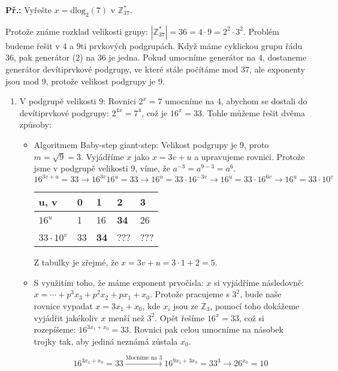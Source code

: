\documentclass[10pt,a4paper]{article}
\begin{document}
\begin{exercise}
\textbf{Př.:} Vyřešte $x = \text{dlog}_2 (7)$ v $\mathbb{Z}_{37}^*$.

Protože známe rozklad velikosti grupy: $|\mathbb{Z}_{37}^*| = 36 = 4 \cdot 9 =
2^2 \cdot 3^2$. Problém budeme řešit v 4 a 9ti prvkových podgrupách. Když máme
cyklickou grupu řádu 36, pak generátor (2) na 36 je jedna. Pokud umocníme
generátor na 4, dostaneme generátor devítiprvkové podgrupy, ve které stále
počítáme mod 37, ale exponenty jsou mod 9, protože velikost podgrupy je 9.

\begin{enumerate}
\item V podgrupě velikosti 9: Rovnici $2^x = 7$ umocníme na 4, abychom se
dostali do devítiprvkové podgrupy: $2^{4x} = 7^4$, což je $16^x = 33$. Tohle
můžeme řešit dvěma způsoby:
\begin{itemize}
\item Algoritmem Baby-step giant-step: Velikost podgrupy je 9, proto $m =
\sqrt{9} = 3$. Vyjádříme $x$ jako $x = 3v + u$ a upravujeme rovnici. Protože
jsme v podgrupě velikosti 9, víme, že $a^{-3} = a^{9-3} = a^6$.
$$16^{3v+u} = 33 \xrightarrow{}16^{3v}16^u = 33 \xrightarrow{}16^u = 33\cdot
16^{-3v} \xrightarrow{} 16^u = 33\cdot 16^{6v} \xrightarrow{}16^u = 33\cdot
10^v$$

\begin{center}
\begin{tabular}{|p{1cm}|p{1cm}|p{1cm}|p{1cm}|p{1cm}|}
\hline
u, v & 0 & 1 & 2 & 3\\
\hline
\hline
$16^u$ & 1 & 16 & \textbf{34} & 26\\
\hline
$33\cdot 10^v$ & 33 & \textbf{34} & ??? & ??? \\
\hline
\end{tabular}
\end{center}

Z tabulky je zřejmé, že $x = 3v + u = 3\cdot 1 + 2 = 5$.

\item S využitím toho, že máme exponent prvočísla: $x$ si vyjádříme následovně:
$x = \cdots + p^3x_3 + p^2x_2 + px_1 + x_0$. Protože pracujeme s $3^2$, bude
naše rovnice vypadat $x = 3x_1 + x_0$, kde $x_i$ jsou ze $\mathbb{Z}_{3}$,
pomocí toho dokážeme vyjádřit jakékoliv $x$ menší než $3^2$. Opět řešíme $16^x =
33$, což si rozepíšeme:  $16^{3x_1 + x_0} = 33$. Rovnici pak celou umocníme na
násobek trojky tak, aby jediná neznámá zůstala $x_0$. 

$$ 16^{3x_1 + x_0} = 33  \xrightarrow{\text{Mocníme na 3}} 16^{9x_1 + 3x_0} =
33^3 \xrightarrow{} 26^{x_0} = 10$$


\end{itemize}
\end{enumerate}
\end{exercise}
\end{document}
